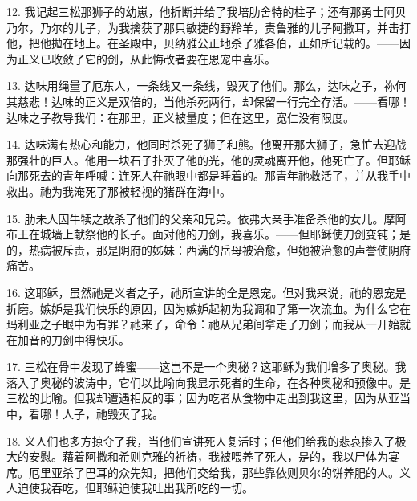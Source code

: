 12. 我记起三松那狮子的幼崽，他折断并给了我培肋舍特的柱子；还有那勇士阿贝乃尔，乃尔的儿子，为我擒获了那只敏捷的野羚羊，责鲁雅的儿子阿撒耳，并击打他，把他拋在地上。在圣殿中，贝纳雅公正地杀了雅各伯，正如所记载的。——因为正义已收敛了它的剑，从此悔改者要在恩宠中喜乐。\par

13. 达味用绳量了厄东人，一条线又一条线，毁灭了他们。那么，达味之子，祢何其慈悲！达味的正义是双倍的，当他杀死两行，却保留一行完全存活。——看哪！达味之子教导我们：\newline{}在那里，正义被量度；但在这里，宽仁没有限度。\par

14. 达味满有热心和能力，他同时杀死了狮子和熊。他离开那大狮子，急忙去迎战那强壮的巨人。他用一块石子扑灭了他的光，他的灵魂离开他，他死亡了。但耶稣向那死去的青年呼喊：\newline{}连死人在祂眼中都是睡着的。那青年祂救活了，并从我手中救出。祂为我淹死了那被轻视的猪群在海中。\par

15. 肋未人因牛犊之故杀了他们的父亲和兄弟。依弗大亲手准备杀他的女儿。摩阿布王在城墙上献祭他的长子。面对他的刀剑，我喜乐。——但耶稣使刀剑变钝；是的，热病被斥责，那是阴府的姊妹：西满的岳母被治愈，但她被治愈的声誉使阴府痛苦。\par

16. 这耶稣，虽然祂是义者之子，祂所宣讲的全是恩宠。但对我来说，祂的恩宠是折磨。嫉妒是我们快乐的原因，因为嫉妒起初为我调和了第一次流血。为什么它在玛利亚之子眼中为有罪？祂来了，命令：\newline{}祂从兄弟间拿走了刀剑；而我从一开始就在加音的刀剑中得快乐。\par

17. 三松在骨中发现了蜂蜜——这岂不是一个奥秘？这耶稣为我们增多了奥秘。我落入了奥秘的波涛中，它们以比喻向我显示死者的生命，在各种奥秘和预像中。是三松的比喻。但我却遭遇相反的事；因为吃者从食物中走出到我这里，因为从亚当中，看哪！人子，祂毁灭了我。\par

18. 义人们也多方掠夺了我，当他们宣讲死人复活时；但他们给我的悲哀掺入了极大的安慰。藉着阿撒和希则克雅的祈祷，我被喂养了死人，是的，我以尸体为宴席。厄里亚杀了巴耳的众先知，把他们交给我，那些靠依则贝尔的饼养肥的人。义人迫使我吞吃，但耶稣迫使我吐出我所吃的一切。\par

